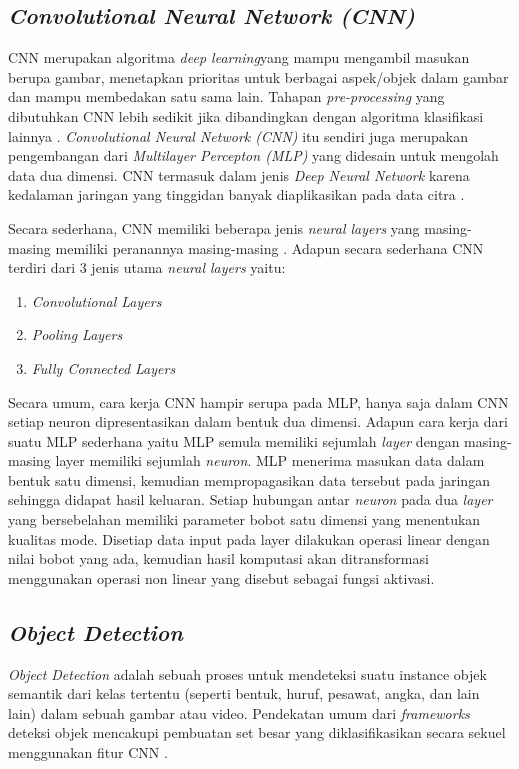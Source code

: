 \subsection{\textit{Convolutional  Neural Network (CNN)}}
CNN merupakan algoritma \textit{deep learning}yang mampu mengambil masukan berupa gambar, menetapkan prioritas untuk berbagai aspek/objek dalam gambar dan mampu membedakan satu sama lain. Tahapan \textit{pre-processing} yang dibutuhkan CNN lebih sedikit jika dibandingkan dengan algoritma klasifikasi lainnya \citep*{towardsDS}. \textit{Convolutional Neural Network (CNN)} itu sendiri juga merupakan pengembangan dari \textit{Multilayer Percepton (MLP)} yang didesain untuk mengolah data dua dimensi. CNN termasuk dalam jenis \textit{Deep Neural Network} karena kedalaman jaringan yang tinggidan banyak diaplikasikan pada data citra \citep*{putra2016klasifikasi}.\par
Secara sederhana, CNN memiliki beberapa jenis \textit{neural layers} yang masing-masing memiliki peranannya masing-masing \citep*{voulodimos2018deep}. Adapun secara sederhana CNN terdiri dari 3 jenis utama \textit{neural layers} yaitu: 
\begin{enumerate}
    \item \textit{Convolutional Layers}
    \item \textit{Pooling Layers}
    \item \textit{Fully Connected Layers}
\end{enumerate}
Secara umum, cara kerja CNN hampir serupa pada MLP, hanya saja dalam CNN setiap neuron dipresentasikan dalam bentuk dua dimensi. Adapun cara kerja dari suatu MLP sederhana yaitu MLP semula memiliki sejumlah \textit{layer} dengan masing-masing layer memiliki sejumlah \textit{neuron}. MLP menerima masukan data dalam bentuk satu dimensi, kemudian mempropagasikan data tersebut pada jaringan sehingga didapat hasil keluaran. 
Setiap hubungan antar \textit{neuron} pada dua \textit{layer} yang bersebelahan memiliki parameter bobot satu dimensi yang menentukan kualitas mode. Disetiap data input pada layer dilakukan operasi linear dengan nilai bobot yang ada, kemudian hasil komputasi akan ditransformasi menggunakan operasi non linear yang disebut sebagai fungsi aktivasi.\\

\subsection{\textit{Object Detection}}
\textit{Object Detection} adalah sebuah proses untuk mendeteksi suatu instance objek semantik dari kelas tertentu (seperti bentuk, huruf, pesawat, angka, dan lain lain) dalam sebuah gambar atau video. Pendekatan umum dari  \textit{frameworks} deteksi objek mencakupi pembuatan set besar yang diklasifikasikan secara sekuel menggunakan fitur CNN \citep*{voulodimos2018deep}. 

